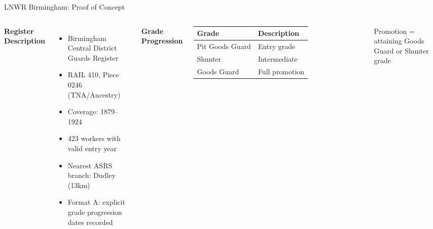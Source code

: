 \documentclass[10pt,aspectratio=169]{beamer}
\begin{document}
\begin{frame}{LNWR Birmingham: Proof of Concept}
\begin{columns}[T,onlytextwidth]
\textbf{\color{RailwayBlue}Register Description}
\begin{itemize}
  \item Birmingham Central District Guards Register
  \item RAIL 410, Piece 0246 (TNA/Ancestry)
  \item Coverage: 1879--1924
  \item 423 workers with valid entry year
  \item Nearest ASRS branch: Dudley (13km)
  \item Format A: explicit grade progression dates recorded
\end{itemize}

\textbf{\color{RailwayBlue}Grade Progression}
\vspace{0.15cm}

\small
\begin{tabular}{ll}
\toprule
\textbf{Grade} & \textbf{Description} \\
\midrule
Pit Goods Guard & Entry grade \\
Shunter & Intermediate \\
Goods Guard & Full promotion \\
\bottomrule
\end{tabular}

\vspace{0.45cm}
\footnotesize Promotion = attaining Goods Guard or Shunter grade
\end{columns}
\end{frame}
\end{document}
